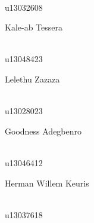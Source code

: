 \documentclass[a4paper,12pt]{report}
\begin{document}
\begin{titlepage}
\begin{center}
\begin{minipage}{0.4\textwidth}
\end{minipage}
\begin{minipage}{0.4\textwidth}
\begin{flushright} \large
\emph{} \\
u13032608
\end{flushright}
\end{minipage}
\begin{minipage}{0.4\textwidth}
\begin{flushleft} \large
Kale-ab {Tessera}
\end{flushleft}
\end{minipage}
\begin{minipage}{0.4\textwidth}
\begin{flushright} \large
\emph{} \\
u13048423
\end{flushright}
\end{minipage}
\begin{minipage}{0.4\textwidth}
\begin{flushleft} \large
Lelethu {Zazaza}
\end{flushleft}
\end{minipage}
\begin{minipage}{0.4\textwidth}
\begin{flushright} \large
\emph{} \\
u13028023
\end{flushright}
\end{minipage}
\begin{minipage}{0.4\textwidth}
\begin{flushleft} \large
Goodness {Adegbenro}
\end{flushleft}
\end{minipage}
\begin{minipage}{0.4\textwidth}
\begin{flushright} \large
\emph{} \\
u13046412
\end{flushright}
\end{minipage}
\begin{minipage}{0.4\textwidth}
\begin{flushleft} \large
Herman Willem {Keuris}
\end{flushleft}
\end{minipage}
\begin{minipage}{0.4\textwidth}
\begin{flushright} \large
\emph{} \\
u13037618
\end{flushright}

\end{minipage}
\end{center}
\end{titlepage}
\end{document}
